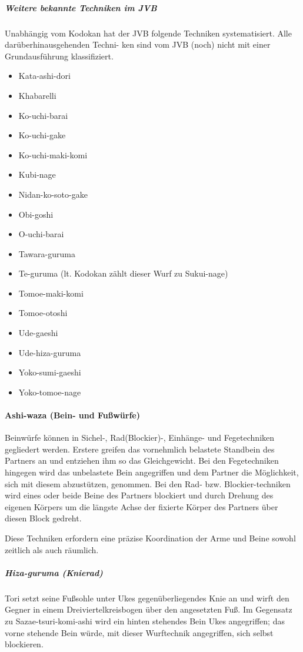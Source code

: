 \documentclass[justified, a4paper, notitlepage, captions=tableheading, nobib]{tufte-handout}
\begin{document}
\subparagraph{Weitere bekannte Techniken im JVB}
\label{sec:org2bdd396}
Unabhängig vom Kodokan hat der JVB folgende Techniken systematisiert. Alle darüberhinausgehenden Techni-
ken sind vom JVB (noch) nicht mit einer Grundausführung klassifiziert.

\begin{itemize}
\item Kata-ashi-dori
\item Khabarelli
\item Ko-uchi-barai
\item Ko-uchi-gake
\item Ko-uchi-maki-komi
\item Kubi-nage
\item Nidan-ko-soto-gake
\item Obi-goshi
\item O-uchi-barai
\item Tawara-guruma
\item Te-guruma (lt. Kodokan zählt dieser Wurf zu Sukui-nage)
\item Tomoe-maki-komi
\item Tomoe-otoshi
\item Ude-gaeshi
\item Ude-hiza-guruma
\item Yoko-sumi-gaeshi
\item Yoko-tomoe-nage
\end{itemize}

\paragraph{\label{org4ce3ed7}Ashi-waza (Bein- und Fußwürfe) }
\label{sec:org8d8f8d6}

Beinwürfe können in Sichel-, Rad(Blockier)-, Einhänge- und Fegetechniken gegliedert werden. Erstere greifen das vornehmlich belastete Standbein des Partners an und entziehen ihm so das Gleichgewicht. Bei den Fegetechniken hingegen wird das unbelastete Bein angegriffen und dem Partner die Möglichkeit, sich mit diesem abzustützen, genommen. Bei den Rad- bzw. Blockier-techniken wird eines oder beide Beine des Partners blockiert und durch Drehung des eigenen Körpers um die längste Achse der fixierte Körper des Partners über diesen Block gedreht. 

Diese Techniken erfordern eine präzise Koordination der Arme und Beine sowohl zeitlich als auch räumlich.

\subparagraph{Hiza-guruma (Knierad)}
\label{sec:org61c03ce}
Tori setzt seine Fußsohle unter Ukes gegenüberliegendes Knie an und wirft den Gegner in einem Dreiviertelkreisbogen über den angesetzten Fuß.
Im Gegensatz zu Sazae-tsuri-komi-ashi wird ein hinten stehendes Bein Ukes angegriffen; das vorne stehende Bein würde, mit dieser Wurftechnik angegriffen, sich selbst blockieren.
\end{document}
